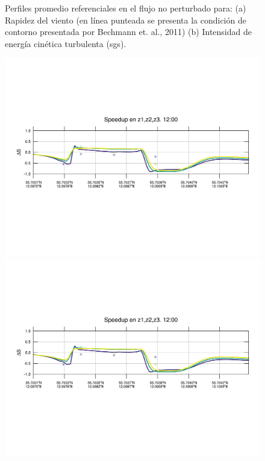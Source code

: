 \begin{figure}[H]
	
	
	\caption{Perfiles promedio referenciales en el flujo no perturbado para: (a) Rapidez del viento (en línea punteada se presenta la condición de contorno presentada por Bechmann et. al., 2011) (b) Intensidad de energía cinética turbulenta (sgs).}
	\label{fig:06_bol_referencia}
\end{figure}

\begin{figure}[H]
	\centering
	\includegraphics[width=0.95\linewidth,trim={12mm 84mm 10mm 74mm},page=1,clip]{Imagenes/06/bol/speedup}\\%
	\includegraphics[width=0.95\linewidth,trim={12mm 84mm 10mm 74mm},page=13,clip]{Imagenes/06/bol/speedup}\\%

\end{figure}
